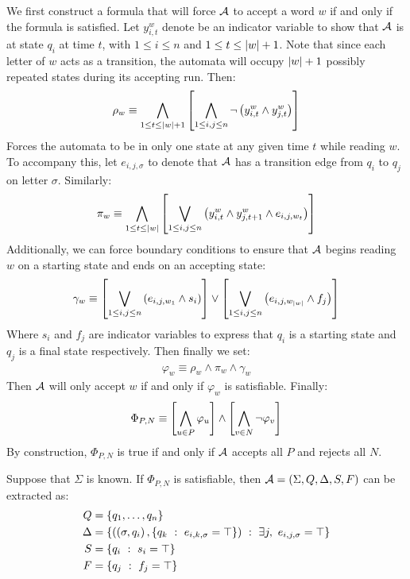 We first construct a formula that will force \(\mathcal{A}\) to accept
a word \(w\) if and only if the formula is satisfied.
Let \(y_{i, t}^w\) denote be an indicator variable
to show that \(\mathcal{A}\) is at state \(q_i\) at time \(t\),
with \(1 \leq i \leq n\) and \(1 \leq t \leq \left\lvert w\right\rvert + 1\).
Note that since each letter of \(w\) acts as a transition,
the automata will occupy \(\left\lvert w\right\rvert + 1\) possibly repeated
states during its accepting run.
Then:
\begin{align*}
  \rho_w \equiv
    \bigwedge_{1 \leq t \leq \left\lvert w\right\rvert + 1}
      \left[\bigwedge_{1 \leq i, j \leq n}
        \neg \left(y_{i, t} ^w \land y_{j, t} ^w\right)\right]
\end{align*}
Forces the automata to be in only one state at any given time \(t\)
while reading \(w\).
To accompany this, let \(e_{i, j, \sigma}\) to denote
that \(\mathcal{A}\) has a transition edge from \(q_i\) to \(q_j\)
on letter \(\sigma\).
Similarly:
\begin{align*}
  \pi_w \equiv
    \bigwedge_{1 \leq t \leq \left\lvert w\right\rvert}
      \left[\bigvee_{1 \leq i, j \leq n}
      \left(y_{i, t} ^w \land y_{j, t + 1} ^w \land e_{i, j, w_t}\right)\right]
\end{align*}
Additionally, we can force boundary conditions to ensure that \(\mathcal{A}\)
begins reading \(w\) on a starting state and ends on an accepting state:
\begin{align*}
  \gamma_{w} \equiv
    \left[\bigvee_{1 \leq i, j \leq n}
        \left(e_{i, j, w_{1}} \land s_i\right)\right]
      \lor
    \left[\bigvee_{1 \leq i, j \leq n}
        \left(e_{i, j, w_{\left\lvert w\right\rvert}} \land f_j\right)\right]
\end{align*}
Where \(s_i\) and \(f_j\) are indicator variables to express that
\(q_i\) is a starting state and \(q_j\) is a final state respectively.
Then finally we set:
\begin{align*}
  \varphi_{w} \equiv \rho_w \land \pi_w \land \gamma_w
\end{align*}
Then \(\mathcal{A}\) will only accept \(w\) if and only if \(\varphi_w\)
is satisfiable.
Finally:
\begin{align*}
  \Phi_{P, N} \equiv
    \left[\bigwedge_{u \in P} \varphi_u\right]
      \land
    \left[\bigwedge_{v \in N} \neg \varphi_v\right]
\end{align*}
By construction, \(\Phi_{P, N}\) is true if and only if \(\mathcal{A}\)
accepts all \(P\) and rejects all \(N\).

Suppose that \(\Sigma\) is known.
If \(\Phi_{P, N}\) is satisfiable,
then \(\mathcal{A} = \left(\Sigma, Q, \Delta, S, F\right)\) can be extracted as:
\begin{align*}
  Q &= \left\{q_1, \ldots, q_n\right\} \\
  \Delta &=
    \left\{\left(\left(\sigma, q_i\right),
                    \left\{q_k \  : \  e_{i, k, \sigma} = \top\right\}\right)
            \  : \  \exists j, \  e_{i, j, \sigma} = \top\right\} \\
  S &= \left\{q_i \  : \  s_i = \top\right\} \\
  F &= \left\{q_j \  : \  f_j = \top\right\}
\end{align*}

